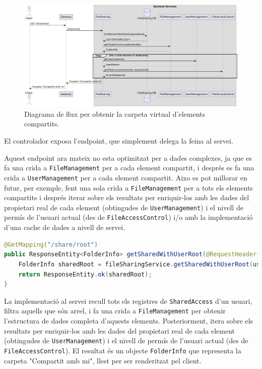 \begin{figure}[H]
    \centering
    \includegraphics[width=\textwidth]{Figures/flux/get_shared_root.png}
    \caption{Diagrama de flux per obtenir la carpeta virtual d'elements compartits.}
\end{figure}

El controlador exposa l'endpoint, que simplement delega la feina al servei.

Aquest endpoint ara mateix no esta optimitzat per a dades complexes, ja que es fa una crida a \texttt{FileManagement} per a cada element compartit, i després es fa una crida a \texttt{UserManagement} per a cada element compartit. Aixo es pot millorar en futur, per exemple, fent una sola crida a \texttt{FileManagement} per a tots els elements compartits i després iterar sobre els resultats per enriquir-los amb les dades del propietari real de cada element (obtingudes de \texttt{UserManagement}) i el nivell de permís de l'usuari actual (des de \texttt{FileAccessControl}) i/o amb la implementació d'una cache de dades a nivell de servei.

\begin{lstlisting}[language=Java, caption={Endpoint per obtenir la carpeta arrel compartida a `FileSharingController`}]
@GetMapping("/share/root")
public ResponseEntity<FolderInfo> getSharedWithUserRoot(@RequestHeader("X-User-Id") UUID userId) {
    FolderInfo sharedRoot = fileSharingService.getSharedWithUserRoot(userId);
    return ResponseEntity.ok(sharedRoot);
}
\end{lstlisting}

La implementació al servei recull tots els registres de \texttt{SharedAccess} d'un usuari, filtra aquells que són arrel, i fa una crida a \texttt{FileManagement} per obtenir l'estructura de dades completa d'aquests elements. Posteriorment, itera sobre els resultats per enriquir-los amb les dades del propietari real de cada element (obtingudes de \texttt{UserManagement}) i el nivell de permís de l'usuari actual (des de \texttt{FileAccessControl}). El resultat és un objecte \texttt{FolderInfo} que representa la carpeta "Compartit amb mi", llest per ser renderitzat pel client.

